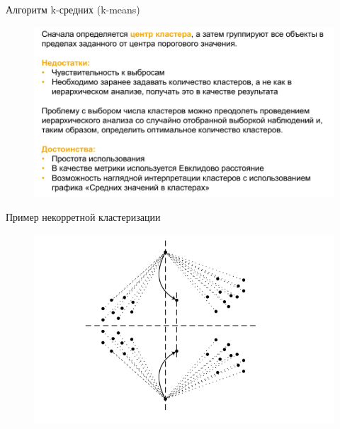 \documentclass{beamer}
\begin{document}
\begin{frame}{Алгоритм k-средних (k-means)}
\begin{figure}[h]
\centering
\includegraphics[scale=0.5]{images/lec07-pic23.png}
\end{figure}
\end{frame}

\begin{frame}{Пример некорретной кластеризации}
\begin{figure}[h]
\centering
\includegraphics[scale=0.75]{images/lec07-pic25.png}
\end{figure}
\end{frame}
\end{document}
